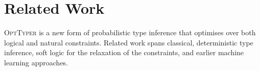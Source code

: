\documentclass[acmsmall,nonacm]{acmart}\settopmatter{printfolios=true,printccs=false,printacmref=false}
\newcommand{\projectname}{\textsc{OptTyper}\xspace}
\newcommand{\margincomment}[2]{\marginpar{\scriptsize\color{Maroon}#1 says: #2}}
\newcommand{\cas}[1]{\margincomment{Charles}{#1}}
\begin{document}



\section{Related Work}\label{sec:related}

\projectname is a new form of probabilistic type inference that optimises over
both logical and natural constraints.  Related work spans classical, deterministic
type inference, soft logic for the relaxation of the constraints, and earlier machine learning approaches.
\end{document}
